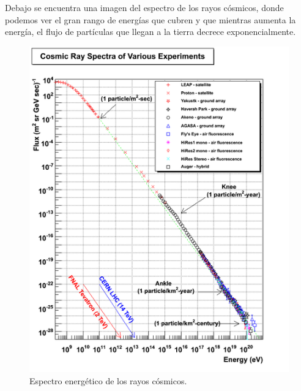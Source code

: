 \documentclass[a4paper,10pt]{article}
\numberwithin{equation}{section}
\begin{document}
\vspace{.3cm}

Debajo se encuentra una imagen del espectro de los rayos cósmicos, donde podemos ver 
el gran rango de energías que cubren y que mientras aumenta la energía, el flujo 
de partículas que llegan a la tierra decrece exponencialmente.

\begin{figure}[H]
 \center 
 \includegraphics[scale=0.7]{fig1}
 \caption{Espectro energético de los rayos cósmicos.}
 \label{fig:fig1}
\end{figure}
\end{document}
